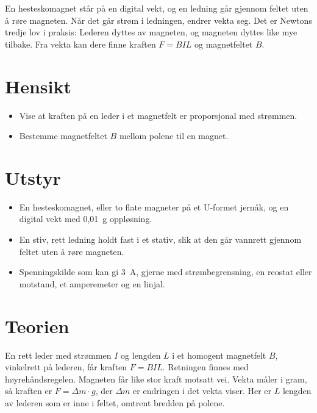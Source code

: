 \documentclass[11pt]{article}
\begin{document}

En hesteskomagnet står på en digital vekt, og en ledning går gjennom feltet uten å røre magneten. Når det går strøm i ledningen, endrer vekta seg. Det er Newtons tredje lov i praksis: Lederen dyttes av magneten, og magneten dyttes like mye tilbake. Fra vekta kan dere finne kraften $F = BIL$ og magnetfeltet $B$.

\section*{Hensikt}

\begin{itemize}
\item Vise at kraften på en leder i et magnetfelt er proporsjonal med strømmen.
\item Bestemme magnetfeltet $B$ mellom polene til en magnet.
\end{itemize}

\section*{Utstyr}

\begin{itemize}
\item En hesteskomagnet, eller to flate magneter på et U-formet jernåk, og en digital vekt med 0,01~g oppløsning.
\item En stiv, rett ledning holdt fast i et stativ, slik at den går vannrett gjennom feltet uten å røre magneten.
\item Spenningskilde som kan gi 3~A, gjerne med strømbegrensning, en reostat eller motstand, et amperemeter og en linjal.
\end{itemize}

\section*{Teorien}

En rett leder med strømmen $I$ og lengden $L$ i et homogent magnetfelt $B$, vinkelrett på lederen, får kraften $F = BIL$. Retningen finnes med høyrehåndsregelen. Magneten får like stor kraft motsatt vei. Vekta måler i gram, så kraften er $F = Δm \cdot g$, der $Δm$ er endringen i det vekta viser. Her er $L$ lengden av lederen som er inne i feltet, omtrent bredden på polene.
\end{document}
